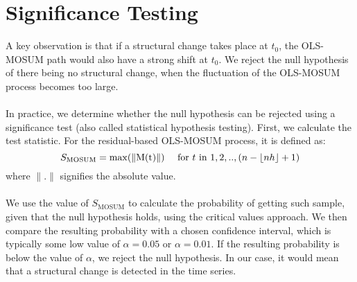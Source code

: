 \documentclass[main.tex]{subfiles}
\begin{document}
\section{Significance Testing}
\label{sec:significance_testing}
A key observation is that if a structural change takes place at $t_0$, the
OLS-MOSUM path would also have a strong shift at $t_0$.
We reject the null hypothesis of there being no structural change, when the fluctuation of
the OLS-MOSUM process becomes too large.\\\\
In practice, we determine whether the null
hypothesis can be rejected using a significance test (also called statistical
hypothesis testing).
First, we calculate the test statistic. For the residual-based OLS-MOSUM
process, it is defined as:
\begin{equation} \label{eq:test_statistic}
  S_{\text{MOSUM}} = \max(\|\text{M(t)}\|) \quad \text{ for } t \text{ in } 1,2,..,(n - \lfloor nh\rfloor + 1)
\end{equation}
where $\| . \|$ signifies the absolute value.\\\\
We use the value of $S_{\text{MOSUM}}$ to calculate the probability of getting such
sample, given that the null hypothesis holds, using the critical values approach.
We then compare the resulting
probability with a chosen confidence interval, which is typically some low value
of $\alpha = 0.05$ or $\alpha = 0.01$. If the resulting probability is below the
value of $\alpha$, we reject the null hypothesis. 
In our case, it would mean that a
structural change is detected in the time series. 
\end{document}
